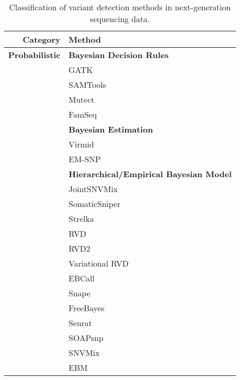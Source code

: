 \documentclass[11pt,reqno]{amsart}
\begin{document}

\begin{table}[htbp]
  \centering
  \caption{Classification of variant detection methods in next-generation sequencing data.}\label{tbl:methods}
  \footnotesize
    \begin{tabular}{rr}
    \toprule
    \textbf{Category} & \multicolumn{1}{l}{\textbf{Method}} \\
    \midrule
    \textbf{Probabilistic} & \multicolumn{1}{l}{\textbf{Bayesian Decision Rules}} \\
          & \multicolumn{1}{l}{GATK} \\
          & \multicolumn{1}{l}{SAMTools} \\
          & \multicolumn{1}{l}{Mutect} \\
          & \multicolumn{1}{l}{FamSeq} \\
          & \multicolumn{1}{l}{\textbf{Bayesian Estimation}} \\
          & \multicolumn{1}{l}{ Virmid} \\
          & \multicolumn{1}{l}{ EM-SNP} \\
          & \multicolumn{1}{l}{\textbf{Hierarchical/Empirical Bayesian Model}} \\
          & \multicolumn{1}{l}{JointSNVMix} \\
          & \multicolumn{1}{l}{SomaticSniper} \\
          & \multicolumn{1}{l}{Strelka} \\
          & \multicolumn{1}{l}{RVD} \\
          & \multicolumn{1}{l}{RVD2} \\
          & \multicolumn{1}{l}{Variational RVD} \\
          & \multicolumn{1}{l}{EBCall} \\
          & \multicolumn{1}{l}{Snape} \\
          & \multicolumn{1}{l}{FreeBayes} \\
          & \multicolumn{1}{l}{Seurat} \\
          & \multicolumn{1}{l}{SOAPsnp} \\
          & \multicolumn{1}{l}{SNVMix} \\
          & \multicolumn{1}{l}{EBM} \\

\end{tabular}
\end{table}
\end{document}
